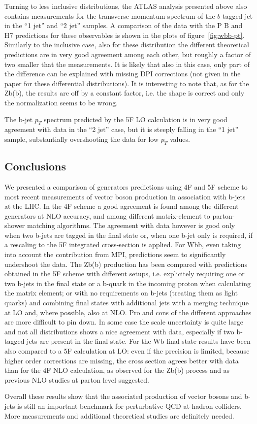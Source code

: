 \documentclass[11pt]{cernrep}
\newcommand{\Herwig}{H\protect\scalebox{0.8}{ERWIG}7\xspace}
\newcommand{\POWHEGBOX}{P\protect\scalebox{0.8}{OWHEG} B\protect\scalebox{0.8}{OX}\xspace}
\begin{document}
Turning to less inclusive distributions, the ATLAS analysis presented
above also contains measurements for the transverse momentum spectrum
of the $b$-tagged jet in the ``1 jet'' and ``2 jet'' samples. A
comparison of the data with the \POWHEGBOX{} and \Herwig predictions
for these observables is shown in the plots of
figure~\ref{fig:wbb-pt}. Similarly to the inclusive case, also for
these distribution the different theoretical predictions are in very
good agreement among each other, but roughly a factor of two smaller
that the measurements. It is likely that also in this case, only part of
the difference can be explained with missing DPI corrections (not given in the paper for these differential distributions). 
It is interesting to note that, as for the Zb(b), the results are off by a constant factor, i.e. the shape is correct and only
the normalization seems to be wrong. 

The b-jet $p_T$ spectrum predicted by the 5F LO calculation is in very good agreement with data in the ``2 jet'' case, but it
is steeply falling in the ``1 jet'' sample, substantially overshooting the data for low $p_T$ values.



\subsection{Conclusions \label{concl}}

We presented a comparison of generators predictions using 4F and 5F scheme to most recent
measurements of vector boson production in association with b-jets at the LHC. In the 4F scheme a good agreement is found among the
different generators at NLO accuracy, and among different matrix-element to parton-shower matching algorithms. The
agreement with data however is good only when two b-jets are tagged in the final state or, when one b-jet only is
required, if a rescaling to the 5F integrated cross-section is applied. For Wbb, even taking into account the contribution from MPI,
predictions seem to significantly undershoot the data. The Zb(b) production has been
compared with predictions obtained in the 5F scheme with different setups, i.e. explicitely requiring one or two b-jets
in the final state or a b-quark in the incoming proton when calculating the matrix element; or with no requirements on
b-jets (treating them as light quarks) and combining final states with additional jets with a merging technique at LO
and, where possible, also at NLO. Pro and cons of the different approaches are more difficult to pin down. In some case
the scale uncertainty is quite large and not all distributions shows a nice agreement with data, especially if two
b-tagged jets are present in the final state. For the Wb final state results have been also compared to a 5F calculation at LO:
even if the precision is limited, because higher order corrections are missing, the cross section
agrees better with data than for the 4F NLO calculation, as observed for the Zb(b) process and as previous NLO studies at parton
level suggested. 

Overall these results show that the associated production of vector bosons and b-jets is still an important benchmark for
perturbative QCD at hadron colliders. More measurements and additional theoretical studies are definitely needed.


\end{document}
